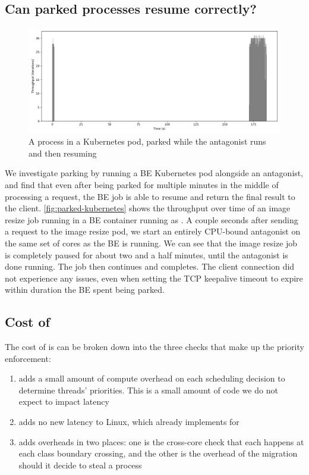 \subsection{Can parked processes resume correctly?}\label{ss:eval:parking}


\begin{figure}[t]
    \centering
    \includegraphics[width=\columnwidth]{graphs/parked-kubernetes.png}
    \caption{A \beclass{} process in a Kubernetes pod, parked while the
    antagonist runs and then resuming}\label{fig:parked-kubernetes}
\end{figure}

We investigate parking by running a BE Kubernetes pod alongside an antagonist,
and find that even after being parked for multiple minutes in the middle of
processing a request, the BE job is able to resume and return the final result
to the client. \autoref{fig:parked-kubernetes} shows the throughput over time of
an image resize job running in a BE container running as \schedbe{}. A couple
seconds after sending a request to the image resize pod, we start an entirely
CPU-bound antagonist on the same set of cores as the BE is running. We can see
that the image resize job is completely paused for about two and a half minutes,
until the antagonist is done running. The job then continues and completes. The
client connection did not experience any issues, even when setting the TCP
keepalive timeout to expire within duration the BE spent being parked.



\subsection{Cost of \schedbe{}}

The cost of \schedbe{} is can be broken down into the three checks that make up
the priority enforcement:

\begin{enumerate}
    \item \local{} adds a small amount of compute overhead on each scheduling
    decision to determine threads' priorities. This is a small amount of code we
    do not expect to impact latency
    \item \entry{} adds no new latency to Linux, which already implements
    \entry{} for \schedidle{}
    \item \exit{} adds overheads in two places: one is the cross-core check that
    each happens at each class boundary crossing, and the other is the overhead
    of the migration should it decide to steal a \schednormal{} process
\end{enumerate}

